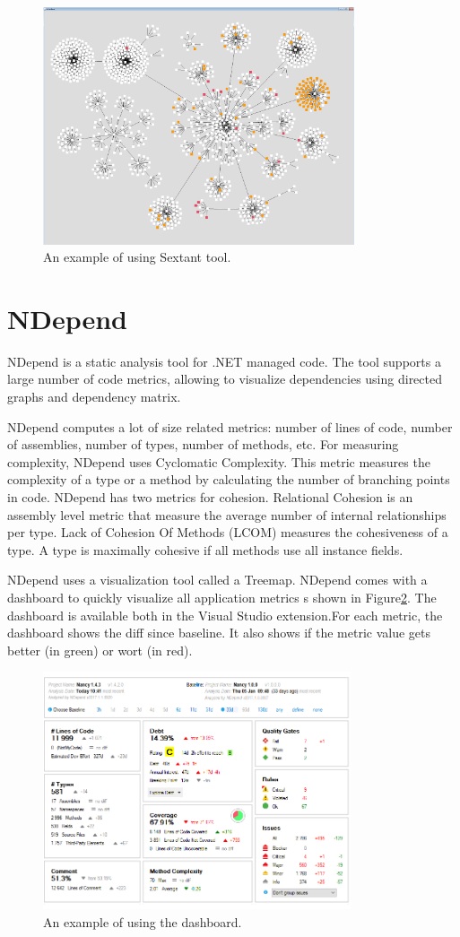 \begin{figure}[h]
	\centering
	\includegraphics[height=70mm]{figures/1.png}
	\caption{An example of using Sextant tool.}
	\label{fig:1}
\end{figure}

\section{NDepend}

NDepend is a static analysis tool for .NET managed code. The tool supports a large number of code metrics, allowing to visualize dependencies using directed graphs and dependency matrix.  

NDepend computes a lot of size related metrics: number of lines of code, number of assemblies, number of types, number of methods, etc. For measuring complexity, NDepend uses Cyclomatic Complexity. This metric measures the complexity of a type or a method by calculating the number of branching points in code.
NDepend has two metrics for cohesion. Relational Cohesion is an assembly level metric that measure the average number of internal relationships per type. Lack of Cohesion Of Methods (LCOM) measures the cohesiveness of a type. A type is maximally cohesive if all methods use all instance fields.

NDepend uses a visualization tool called a Treemap.
NDepend comes with a dashboard to quickly visualize all application metrics s shown in Figure\ref{fig:dash}. The dashboard is available both in the Visual Studio extension.For each metric, the dashboard shows the diff since baseline. It also shows if the metric value gets better (in green) or wort (in red). 

\begin{figure}[h]
	\centering
	\includegraphics[height=70mm]{figures/dash.png}
	\caption{An example of using the dashboard.}
	\label{fig:dash}
\end{figure}

